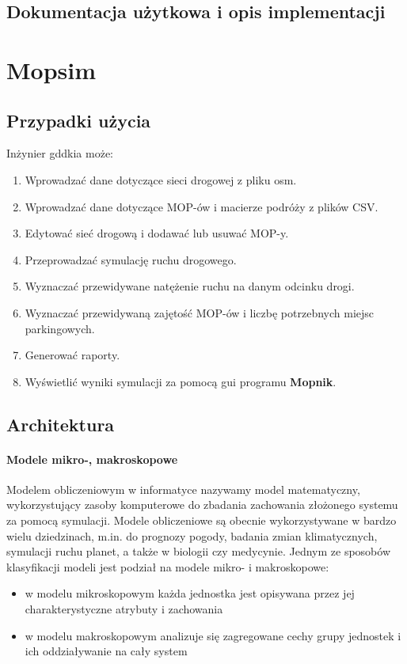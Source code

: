 \section{Dokumentacja użytkowa i opis implementacji}

\chapter{Mopsim}\label{r:Mopsim}

\section{Przypadki użycia}
Inżynier \acrshort{gddkia} może:
\begin{enumerate}
  \item Wprowadzać dane dotyczące sieci drogowej z pliku osm.
  \item Wprowadzać dane dotyczące MOP-ów i macierze podróży z plików CSV.
  \item Edytować sieć drogową i dodawać lub usuwać MOP-y.
  \item Przeprowadzać symulację ruchu drogowego.
  \item Wyznaczać przewidywane natężenie ruchu na danym odcinku drogi.
  \item Wyznaczać przewidywaną zajętość MOP-ów i liczbę potrzebnych miejsc parkingowych.
  \item Generować raporty.
  \item Wyświetlić wyniki symulacji za pomocą \acrshort{gui} programu \textbf{Mopnik}.
\end{enumerate}

\section{Architektura}

\subsubsection{Modele mikro-, makroskopowe}
Modelem obliczeniowym w informatyce nazywamy model matematyczny, wykorzystujący zasoby komputerowe do zbadania zachowania złożonego systemu za pomocą symulacji\cite{model}. Modele obliczeniowe są obecnie wykorzystywane w bardzo wielu dziedzinach, m.in. do prognozy pogody, badania zmian klimatycznych, symulacji ruchu planet, a także w biologii czy medycynie. Jednym ze sposobów klasyfikacji modeli jest podział na modele mikro- i makroskopowe\cite{micmac}:
\begin{itemize}
\item w modelu mikroskopowym każda jednostka jest opisywana przez jej charakterystyczne atrybuty i zachowania
\item w modelu makroskopowym analizuje się zagregowane cechy grupy jednostek i ich oddziaływanie na cały system
\end{itemize}
